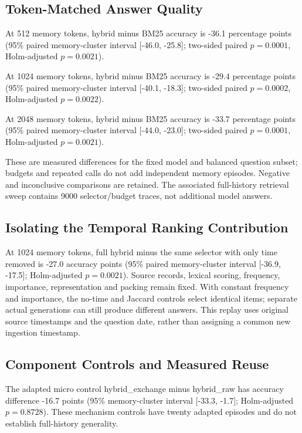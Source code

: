 \subsection{Token-Matched Answer Quality}

At 512 memory tokens, hybrid minus BM25 accuracy is -36.1 percentage points (95\% paired memory-cluster interval [-46.0, -25.8]; two-sided paired $p=0.0001$, Holm-adjusted $p=0.0021$).

At 1024 memory tokens, hybrid minus BM25 accuracy is -29.4 percentage points (95\% paired memory-cluster interval [-40.1, -18.3]; two-sided paired $p=0.0002$, Holm-adjusted $p=0.0022$).

At 2048 memory tokens, hybrid minus BM25 accuracy is -33.7 percentage points (95\% paired memory-cluster interval [-44.0, -23.0]; two-sided paired $p=0.0001$, Holm-adjusted $p=0.0021$).

These are measured differences for the fixed model and balanced question subset; budgets and repeated calls do not add independent memory episodes. Negative and inconclusive comparisons are retained. The associated full-history retrieval sweep contains 9000 selector/budget traces, not additional model answers.

\subsection{Isolating the Temporal Ranking Contribution}

At 1024 memory tokens, full hybrid minus the same selector with only time removed is -27.0 accuracy points (95\% paired memory-cluster interval [-36.9, -17.5]; Holm-adjusted $p=0.0021$). Source records, lexical scoring, frequency, importance, representation and packing remain fixed. With constant frequency and importance, the no-time and Jaccard controls select identical items; separate actual generations can still produce different answers. This replay uses original source timestamps and the question date, rather than assigning a common new ingestion timestamp.

\subsection{Component Controls and Measured Reuse}

The adapted micro control hybrid\_exchange minus hybrid\_raw has accuracy difference -16.7 points (95\% memory-cluster interval [-33.3, -1.7]; Holm-adjusted $p=0.8728$). These mechanism controls have twenty adapted episodes and do not establish full-history generality.

